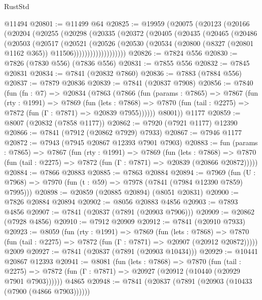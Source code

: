 \begin{lexlean}{RustStd}
\begin{coremodule}
{\begin{coremodule}
{{{{{{{{{{{{{{{{{{{{{{{{{{{{{{{{{{{{{{{{{{{{{{{{{{{{{{    @11494
@20801 := @11499 @64
@20825 := @19959
    (@20075
      (@20123
        (@20166
          (@20204
            (@20255
              (@20298
                (@20335
                  (@20372
                    (@20405
                      (@20435
                        (@20465
                          (@20486
                            (@20503
                              (@20517
                                (@20521
                                  (@20526
                                    (@20530
                                      (@20534
                                        (@20800
                                          (@8327 (@20801 @1162 @365))
                                          @11506)))))))))))))))))))
@20826 := @7824 @556
@20830 := @7826 (@7830 @556) (@7836 @556)
@20831 := @7855 @556
@20832 := @7845 @20831
@20834 := @7841 (@20832 @7860)
@20836 := @7883 (@7884 @556)
@20837 := @7879 @20836
@20839 := @7841 (@20837 @7908)
@20856 := @7840
    (fun (fn : @7) =>
    @20834
      (@7863
        (@7866
          (fun (params : @7865) =>
          @7867
            (fun (rty : @1991) =>
            @7869
              (fun (lets : @7868) =>
              @7870 (fun (tail : @2275) => @7872 (fun (Γ : @7871) => @20839 @7955))))))
        @8001))
    @1177
@20859 := @8007 (@20832 (@7858 @1177))
@20862 := @7920 (@7921 @1177) @12390
@20866 := @7841 (@7912 (@20862 @7929) @7933)
@20867 := @7946 @1177
@20872 := @7943 (@7945 @20867 @12393 @7901 @7903)
@20883 := fun (params : @7865) =>
  @7867
    (fun (rty : @1991) =>
    @7869
      (fun (lets : @7868) =>
      @7870 (fun (tail : @2275) => @7872 (fun (Γ : @7871) => @20839 (@20866 @20872)))))
@20884 := @7866 @20883
@20885 := @7863 @20884
@20894 := @7969
    (fun (U : @7968) => @7970 (fun (t : @59) => @7978 (@7841 (@7984 @12390 @7859) @7995)))
@20898 := @20859 (@20885 @20894) (@8051 @20831)
@20900 := @7826 @20884 @20894
@20902 := @8056 @20883 @4856
@20903 := @7893 @4856
@20907 := @7841 (@20837 (@7891 (@20903 @7906)))
@20909 := @20862 (@7928 @4856)
@20910 := @7912 @20909
@20912 := @7841 (@20910 @7933)
@20923 := @8059
    (fun (rty : @1991) =>
    @7869
      (fun (lets : @7868) =>
      @7870 (fun (tail : @2275) => @7872 (fun (Γ : @7871) => @20907 (@20912 @20872)))))
    @2009
@20927 := @7841 (@20837 (@7891 (@20903 @10434)))
@20929 := @10441 @20867 @12393
@20941 := @8081
    (fun (lets : @7868) =>
    @7870
      (fun (tail : @2275) =>
      @7872 (fun (Γ : @7871) => @20927 (@20912 (@10440 (@20929 @7901 @7903))))))
    @4865
@20948 := @7841 (@20837 (@7891 (@20903 (@10433 (@7900 (@4866 @7903))))))
}}}}}}}}}}}}}}}}}}}}}}}}}}}}}}}}}}}}}}}}}}}}}}}}}}}}}}
\end{coremodule}}
\end{coremodule}
\end{lexlean}
